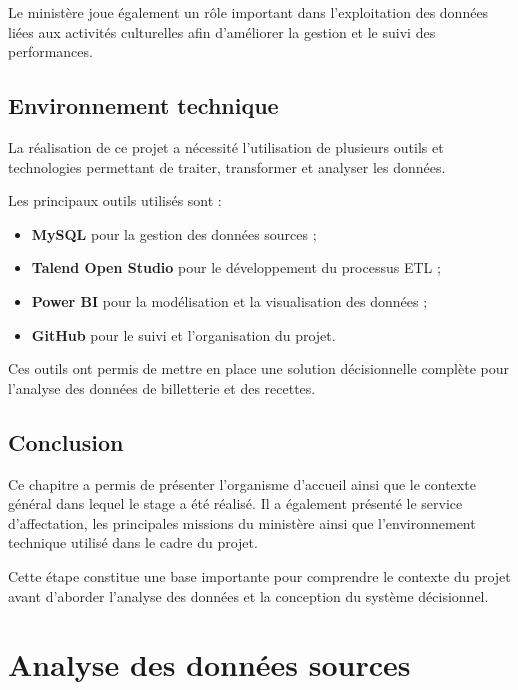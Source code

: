 \documentclass[12pt,a4paper]{report}
\begin{document}
Le ministère joue également un rôle important dans l’exploitation des données liées aux activités culturelles afin d’améliorer la gestion et le suivi des performances.


\section{Environnement technique}

La réalisation de ce projet a nécessité l’utilisation de plusieurs outils et technologies permettant de traiter, transformer et analyser les données.

Les principaux outils utilisés sont :

\begin{itemize}
	\item \textbf{MySQL} pour la gestion des données sources ;
	\item \textbf{Talend Open Studio} pour le développement du processus ETL ;
	\item \textbf{Power BI} pour la modélisation et la visualisation des données ;
	\item \textbf{GitHub} pour le suivi et l’organisation du projet.
\end{itemize}

Ces outils ont permis de mettre en place une solution décisionnelle complète pour l’analyse des données de billetterie et des recettes.


\section*{Conclusion}

Ce chapitre a permis de présenter l’organisme d’accueil ainsi que le contexte général dans lequel le stage a été réalisé. Il a également présenté le service d’affectation, les principales missions du ministère ainsi que l’environnement technique utilisé dans le cadre du projet.

Cette étape constitue une base importante pour comprendre le contexte du projet avant d’aborder l’analyse des données et la conception du système décisionnel.

\chapter{Analyse des données sources}
\end{document}
